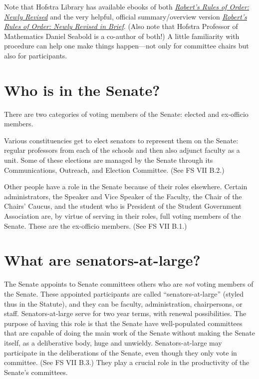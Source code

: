\documentclass[12pt]{article}
\begin{document}
Note that Hofstra Library has available ebooks of both
\href{https://hofstra.on.worldcat.org/oclc/1192561100}{\emph{Robert's
Rules of Order: Newly Revised}} and the very helpful, official
summary/overview version
\href{https://hofstra.on.worldcat.org/oclc/1192973323}{\emph{Robert's
Rules of Order: Newly Revised in Brief}}. (Also note that Hofstra
Professor of Mathematics Daniel Seabold is a co-author of both!) A
little familiarity with procedure can help one make things happen---not
only for committee chairs but also for participants.

\section{Who is in the Senate?}\label{who-is-in-the-senate}

There are two categories of voting members of the Senate: elected and
ex-officio members.

Various constituencies get to elect senators to represent them on the
Senate: regular professors from each of the schools and then also
adjunct faculty as a unit. Some of these elections are managed by the
Senate through its Communications, Outreach, and Election Committee.
(See FS VII B.2.)

Other people have a role in the Senate because of their roles elsewhere.
Certain administrators, the Speaker and Vice Speaker of the Faculty, the
Chair of the Chairs' Caucus, and the student who is President of the
Student Government Association are, by virtue of serving in their roles,
full voting members of the Senate. These are the ex-officio members.
(See FS VII B.1.)

\section{What are senators-at-large?}\label{what-are-senators-at-large}

The Senate appoints to Senate committees others who are \emph{not}
voting members of the Senate. These appointed participants are called
``senators-at-large'' (styled thus in the Statute), and they can be
faculty, administration, chairpersons, or staff. Senators-at-large serve
for two year terms, with renewal possibilities. The purpose of having
this role is that the Senate have well-populated committees that are
capable of doing the main work of the Senate without making the Senate
itself, as a deliberative body, huge and unwieldy. Senators-at-large may
participate in the deliberations of the Senate, even though they only
vote in committee. (See FS VII B.3.) They play a crucial role in the
productivity of the Senate's committees.
\end{document}

